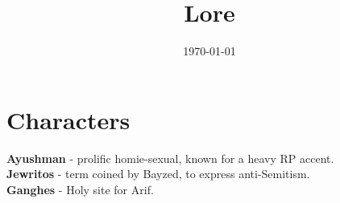 \documentclass{article}
\title{Lore}
\author{}
\date{\today}
\begin{document}
\maketitle
\section*{Characters}

\textbf{Ayushman} - prolific homie-sexual, known for a heavy RP accent.\\
\textbf{Jewritos} - term coined by Bayzed, to express anti-Semitism.
\\
\textbf{Ganghes} - Holy site for Arif.
\end{document}
